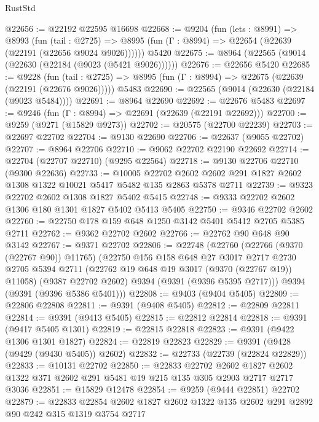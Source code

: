 \begin{lexlean}{RustStd}
\begin{coremodule}
@22656 := @22192 @22595 @16698
@22668 := @9204
    (fun (lets : @8991) =>
    @8993
      (fun (tail : @2725) =>
      @8995 (fun (Γ : @8994) => @22654 (@22639 (@22191 (@22656 @9024 @9026))))))
    @5420
@22675 := @8964 (@22565 (@9014 (@22630 (@22184 (@9023 (@5421 @9026))))))
@22676 := @22656 @5420
@22685 := @9228
    (fun (tail : @2725) => @8995 (fun (Γ : @8994) => @22675 (@22639 (@22191 (@22676 @9026)))))
    @5483
@22690 := @22565 (@9014 (@22630 (@22184 (@9023 @5484))))
@22691 := @8964 @22690
@22692 := @22676 @5483
@22697 := @9246 (fun (Γ : @8994) => @22691 (@22639 (@22191 @22692)))
@22700 := @9259 (@9271 (@15829 @9273))
@22702 := @20575 (@22700 @22239)
@22703 := @22697 @22702
@22704 := @9130 @22690
@22706 := @22637 (@9055 @22702)
@22707 := @8964 @22706
@22710 := @9062 @22702 @22190 @22692
@22714 := @22704 (@22707 @22710) (@9295 @22564)
@22718 := @9130 @22706 @22710 (@9300 @22636)
@22733 := @10005
    @22702
    @2602
    @2602
    @291
    @1827
    @2602
    @1308
    @1322
    @10021
    @5417
    @5482
    @135
    @2863
    @5378
    @2711
@22739 := @9323 @22702 @2602 @1308 @1827 @5402 @5415
@22748 := @9333 @22702 @2602 @1306 @180 @1301 @1827 @5402 @5413 @5405
@22750 := @9346 @22702 @2602
@22760 := @22750 @178 @159 @648 @1250 @3142 @5401 @5412 @2705 @5385 @2711
@22762 := @9362 @22702 @2602
@22766 := @22762 @90 @648 @90 @3142
@22767 := @9371 @22702
@22806 := @22748
    (@22760
      (@22766 (@9370 (@22767 @90)) @11765)
      (@22750
        @156
        @158
        @648
        @27
        @3017
        @2717
        @2730
        @2705
        @5394
        @2711
        (@22762 @19 @648 @19 @3017 (@9370 (@22767 @19)) @11058)
        (@9387 @22702 @2602)
        @9394
        (@9391 (@9396 @5395 @2717)))
      @9394
      (@9391 (@9396 @5386 @5401)))
@22808 := @9403 (@9404 @5405)
@22809 := @22806 @22808
@22811 := @9391 (@9408 @5405)
@22812 := @22809 @22811
@22814 := @9391 (@9413 @5405)
@22815 := @22812 @22814
@22818 := @9391 (@9417 @5405 @1301)
@22819 := @22815 @22818
@22823 := @9391 (@9422 @1306 @1301 @1827)
@22824 := @22819 @22823
@22829 := @9391 (@9428 (@9429 (@9430 @5405)) @2602)
@22832 := @22733 (@22739 (@22824 @22829))
@22833 := @10131 @22702
@22850 := @22833
    @22702
    @2602
    @1827
    @2602
    @1322
    @371
    @2602
    @291
    @5481
    @19
    @215
    @135
    @305
    @2903
    @2717
    @2717
    @3036
@22851 := @15829 @12478
@22854 := @9259 (@9444 @22851) @22702
@22879 := @22833
    @22854
    @2602
    @1827
    @2602
    @1322
    @135
    @2602
    @291
    @2892
    @90
    @242
    @315
    @1319
    @3754
    @2717

\end{coremodule}
\end{lexlean}
